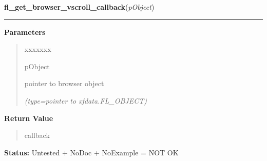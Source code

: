 \hspace{.8\funcindent}\begin{boxedminipage}{\funcwidth}

    \raggedright \textbf{fl\_get\_browser\_vscroll\_callback}(\textit{pObject})

    \vspace{-1.5ex}

    \rule{\textwidth}{0.5\fboxrule}
\setlength{\parskip}{2ex}
\setlength{\parskip}{1ex}
      \textbf{Parameters}
      \vspace{-1ex}

      \begin{quote}
        \begin{Ventry}{xxxxxxx}

          \item[pObject]

          pointer to browser object

            {\it (type=pointer to xfdata.FL\_OBJECT)}

        \end{Ventry}

      \end{quote}

      \textbf{Return Value}
    \vspace{-1ex}

      \begin{quote}
      callback

      \end{quote}

\textbf{Status:} Untested + NoDoc + NoExample = NOT OK



    \end{boxedminipage}

    \label{xformslib:library:fl_add_roundbutton}

    \vspace{0.5ex}

